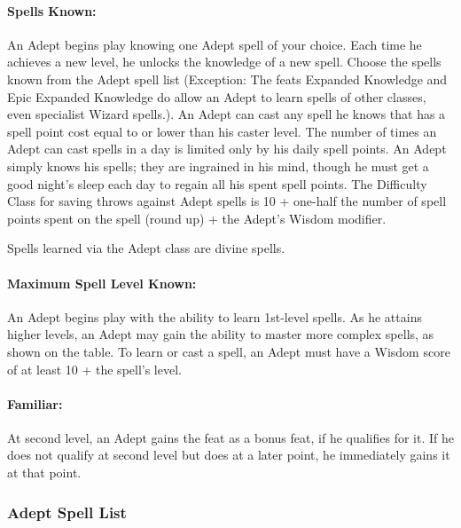\paragraph{Spells Known:} An Adept begins play knowing one Adept spell of your choice. 
Each time he achieves a new level, he unlocks the knowledge of a new spell.
Choose the spells known from the Adept spell list (Exception: The feats Expanded Knowledge and Epic Expanded Knowledge do allow an Adept to learn spells of other classes, even specialist Wizard spells.).
An Adept can cast any spell he knows that has a spell point cost equal to or lower than his caster level.
The number of times an Adept can cast spells in a day is limited only by his daily spell points. 
An Adept simply knows his spells; they are ingrained in his mind, though he must get a good night's sleep each day to regain all his spent spell points.
The Difficulty Class for saving throws against Adept spells is 10 + one-half the number of spell points spent on the spell (round up) + the Adept's Wisdom modifier. 

Spells learned via the Adept class are divine spells.
\paragraph{Maximum Spell Level Known:} An Adept begins play with the ability to learn 1st-level spells. 
As he attains higher levels, an Adept may gain the ability to master more complex spells, as shown on the  table.
To learn or cast a spell, an Adept must have a Wisdom score of at least 10 + the spell's level.

\paragraph{Familiar:}
At second level, an Adept gains the  feat as a bonus feat, if he qualifies for it.
If he does not qualify at second level but does at a later point, he immediately gains it at that point.

\subsubsection{Adept Spell List}
